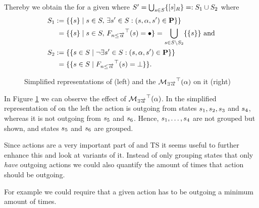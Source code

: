 \documentclass[preview]{standalone}
\begin{document}
Thereby we obtain the \viewN \viewhasoutaction for a given \chgphN \chgph where ${S}' = \bigcup_{{s} \in {S}} \{{{[{s}]_{{R}}}}\} =: {S}_1 \cup {S}_2$ where
\begin{align*}
	\states_1 &:= \{\{\state\} \mid \state \in \states,\, \exists \state' \in \states: (\state, \action, \state') \in \trans\}\} \\
	&\;= \{\{\state\} \mid \state \in \states,\, \gfctminoutaction(\state) = \remelem\} = \nogroupstates \text{   and} \\
	\states_2 &:= \{\{\state \in \states \mid \lnot \exists \state' \in \states: (\state, \action, \state') \in \trans\}\} \\
	&\;= \{\{\state \in \states \mid \gfctminoutaction(\state) = \notppty\}\}.
\end{align*}

\begin{figure}[h]
	\begin{minipage}{.5\textwidth}
		\hspace{5mm}
		
	\end{minipage}%
	\begin{minipage}{.5\textwidth}
		\hspace{5mm}
		
	\end{minipage}
	\caption{Simplified representations of \mdp (left) and the \viewN ${{{{{\mathcal{M}}}}_{{\exists{\overrightarrow{\ensuremath{{\alpha}}}}}}}^{\top}}({\alpha})$ on it (right)}
	\label{fig:outActHasAfter}  
\end{figure}

In Figure \ref{fig:outActHasAfter} we can observe the effect of ${{{{{\mathcal{M}}}}_{{\exists{\overrightarrow{\ensuremath{{\alpha}}}}}}}^{\top}}({\alpha})$. In the simplified representation of \achgphN on the left the action \action is outgoing from states ${s}_1, {s}_2, {s}_3$ and ${s}_4$, whereas it is not outgoing from ${s}_5$ and ${s}_6$. Hence, ${s}_1, \dots, {s}_4$ are not grouped but shown, and states ${s}_5$ and ${s}_6$ are grouped.

Since actions are a very important part of \chgphsN and TS it seems useful to further enhance this \viewN and look at variants of it. Instead of only grouping states that only \emph{have} outgoing actions we could also quantify the amount of times that action should be outgoing.


For example we could require that a given action has to be outgoing a minimum amount of times. 
\end{document}
